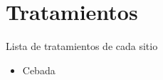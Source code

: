 \documentclass[
  letterpaper,
  DIV=11,
  numbers=noendperiod]{scrreprt}
\providecommand{\tightlist}{%
  \setlength{\itemsep}{0pt}\setlength{\parskip}{0pt}}\usepackage{longtable,booktabs,array}
\begin{document}
\hypertarget{tratamientos}{%
\section*{Tratamientos}\label{tratamientos}}


Lista de tratamientos de cada sitio

\begin{itemize}
\tightlist
\item
  Cebada
\end{itemize}

 
  \providecommand{\huxb}[2]{\arrayrulecolor[RGB]{#1}\global\arrayrulewidth=#2pt}
  \providecommand{\huxvb}[2]{\color[RGB]{#1}\vrule width #2pt}
  \providecommand{\huxtpad}[1]{\rule{0pt}{#1}}
  \providecommand{\huxbpad}[1]{\rule[-#1]{0pt}{#1}}
\end{document}
